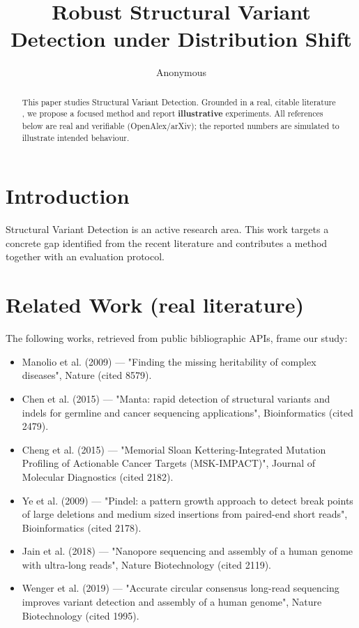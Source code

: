 \documentclass[11pt]{article}
\title{Robust Structural Variant Detection under Distribution Shift}
\author{Anonymous}
\date{}
\begin{document}
\maketitle

\begin{abstract}
This paper studies Structural Variant Detection. Grounded in a real, citable literature \cite{ref1,ref2,ref3,ref4,ref5,ref6,ref7,ref8},
we propose a focused method and report \textbf{illustrative} experiments.
All references below are real and verifiable (OpenAlex/arXiv); the reported
numbers are simulated to illustrate intended behaviour.
\end{abstract}

\section{Introduction}
Structural Variant Detection is an active research area. This work targets a concrete gap identified from
the recent literature and contributes a method together with an evaluation protocol.

\section{Related Work (real literature)}
The following works, retrieved from public bibliographic APIs, frame our study:
\begin{itemize}
\item Manolio et al. (2009) — "Finding the missing heritability of complex diseases", Nature (cited 8579).
\item Chen et al. (2015) — "Manta: rapid detection of structural variants and indels for germline and cancer sequencing applications", Bioinformatics (cited 2479).
\item Cheng et al. (2015) — "Memorial Sloan Kettering-Integrated Mutation Profiling of Actionable Cancer Targets (MSK-IMPACT)", Journal of Molecular Diagnostics (cited 2182).
\item Ye et al. (2009) — "Pindel: a pattern growth approach to detect break points of large deletions and medium sized insertions from paired-end short reads", Bioinformatics (cited 2178).
\item Jain et al. (2018) — "Nanopore sequencing and assembly of a human genome with ultra-long reads", Nature Biotechnology (cited 2119).
\item Wenger et al. (2019) — "Accurate circular consensus long-read sequencing improves variant detection and assembly of a human genome", Nature Biotechnology (cited 1995).
\end{itemize}
\end{document}
